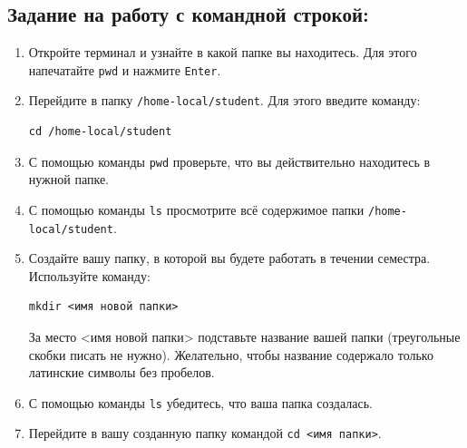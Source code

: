 \documentclass{article}
\begin{document}
\subsection*{Задание на работу с командной строкой:}
\begin{enumerate}
\item Откройте терминал и узнайте в какой папке вы находитесь. Для этого напечатайте \texttt{pwd} и нажмите \texttt{Enter}.
\item Перейдите в папку  \texttt{/home-local/student}. Для этого введите команду:
\begin{verbatim}
cd /home-local/student
\end{verbatim}
\item С помощью команды \texttt{pwd} проверьте, что вы действительно находитесь в нужной папке.
\item С помощью команды \texttt{ls} просмотрите всё содержимое папки \texttt{/home-local/student}.
\item Создайте вашу папку, в которой вы будете работать в течении семестра. Используйте команду:
\begin{verbatim}
mkdir <имя новой папки> 
\end{verbatim}
За место <имя новой папки>  подставьте название вашей папки (треугольные скобки писать не нужно). Желательно, чтобы название содержало только латинские символы без пробелов.
\item С помощью команды \texttt{ls} убедитесь, что ваша папка создалась.
\item Перейдите в вашу созданную папку командой \texttt{cd <имя папки>}.


\end{enumerate}
\end{document}
